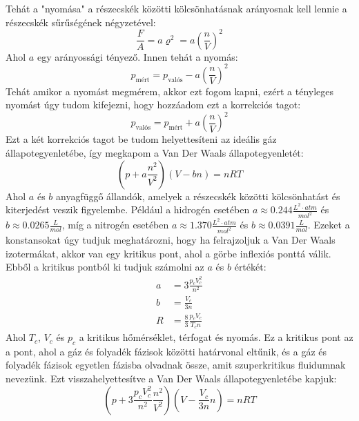 \documentclass[a4paper,12pt]{article}
\begin{document}
Tehát a "nyomása" a részecskék közötti kölcsönhatásnak arányosnak kell lennie a részecskék sűrűségének négyzetével:
\begin{equation}
    \frac{F}{A} = a \varrho^2 = a \left(\frac{n}{V}\right)^2
\end{equation}
Ahol $a$ egy arányossági tényező. Innen tehát a nyomás:
\begin{equation}
    p_{\text{mért}} = p_{\text{valós}} - a \left(\frac{n}{V}\right)^2
\end{equation}
Tehát amikor a nyomást megmérem, akkor ezt fogom kapni, ezért a tényleges nyomást úgy tudom kifejezni, hogy hozzáadom ezt a korrekciós tagot:
\begin{equation}
    p_{\text{valós}} = p_{\text{mért}} + a \left(\frac{n}{V}\right)^2
\end{equation}
Ezt a két korrekciós tagot be tudom helyettesíteni az ideális gáz állapotegyenletébe, így megkapom a Van Der Waals állapotegyenletét:
\begin{equation}
    \left(p + a \frac{n^2}{V^2}\right) (V - b n) = n R T
\end{equation}
Ahol $a$ és $b$ anyagfüggő állandók, amelyek a részecskék közötti kölcsönhatást és kiterjedést veszik figyelembe. Például a hidrogén esetében $a \approx 0.244 \frac{L^2 \cdot atm}{mol^2}$ és $b \approx 0.0265 \frac{L}{mol}$, míg a
nitrogén esetében $a \approx 1.370 \frac{L^2 \cdot atm}{mol^2}$ és $b \approx 0.0391 \frac{L}{mol}$. Ezeket a konstansokat úgy tudjuk meghatározni,
hogy ha felrajzoljuk a Van Der Waals izotermákat, akkor van egy kritikus pont, ahol a görbe inflexiós ponttá válik. Ebből a kritikus pontból ki tudjuk számolni az $a$ és $b$ értékét:
\begin{equation}
    \begin{aligned}
        a &= 3\frac{p_c V_c^2}{n^2} \\
        b &= \frac{V_c}{3n} \\
        R &= \frac{8}{3} \frac{p_c V_c}{T_c n}
    \end{aligned}
\end{equation}
Ahol $T_c$, $V_c$ és $p_c$ a kritikus hőmérséklet, térfogat és nyomás. Ez a kritikus pont az a pont, ahol a gáz és folyadék fázisok közötti határvonal eltűnik, és a gáz és folyadék fázisok egyetlen fázisba olvadnak össze, amit szuperkritikus fluidumnak nevezünk.
Ezt visszahelyettesítve a Van Der Waals állapotegyenletébe kapjuk:
\begin{equation}
    \left(p + 3\frac{p_c V_c^2}{n^2} \frac{n^2}{V^2}\right) \left(V - \frac{V_c}{3n} n\right) = n R T
\end{equation}
\end{document}
